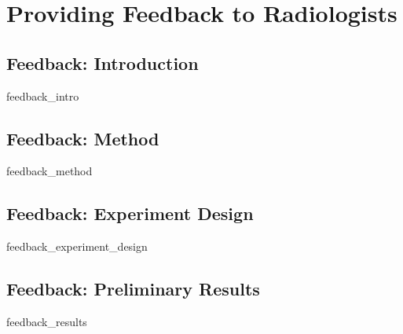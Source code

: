 \chapter{Providing Feedback to Radiologists}

\section{Feedback: Introduction}
{feedback_intro}
\clearpage

\section{Feedback: Method}
{feedback_method}
\clearpage

\section{Feedback: Experiment Design}
{feedback_experiment_design}
\clearpage

\section{Feedback: Preliminary Results}
{feedback_results}
\clearpage

